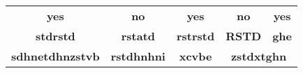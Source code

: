 \begin{table}[h]
\begin{tabular}{|c|cccc|}
\hline
\textbf{yes}            & \multicolumn{1}{c|}{\textbf{no}}        & \textbf{yes}                          & \multicolumn{1}{c|}{\textbf{no}}   & \textbf{yes} \\ \cline{1-1} \cline{3-5} 
\textbf{stdrstd}        & \textbf{rstatd}                         & \multicolumn{1}{c|}{\textbf{rstrstd}} & \multicolumn{1}{c|}{\textbf{RSTD}} & \textbf{ghe} \\ \hline
\textbf{sdhnetdhnzstvb} & \multicolumn{1}{c|}{\textbf{rstdhnhni}} & \multicolumn{1}{c|}{\textbf{xcvbe}}   & \multicolumn{2}{c|}{\textbf{zstdxtghn}}           \\ \hline
\end{tabular}
\label{tab:Random}
\end{table}